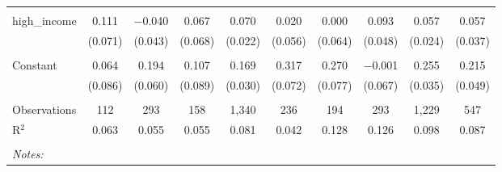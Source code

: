 \begin{table}[!htbp]
\begin{tabular}{@{\extracolsep{5pt}}lccccccccc}
  & & & & & & & & & \\ 
 high\_income & 0.111 & $-$0.040 & 0.067 & 0.070 & 0.020 & 0.000 & 0.093 & 0.057 & 0.057 \\ 
  & (0.071) & (0.043) & (0.068) & (0.022) & (0.056) & (0.064) & (0.048) & (0.024) & (0.037) \\ 
  & & & & & & & & & \\ 
 Constant & 0.064 & 0.194 & 0.107 & 0.169 & 0.317 & 0.270 & $-$0.001 & 0.255 & 0.215 \\ 
  & (0.086) & (0.060) & (0.089) & (0.030) & (0.072) & (0.077) & (0.067) & (0.035) & (0.049) \\ 
  & & & & & & & & & \\ 
Observations & 112 & 293 & 158 & 1,340 & 236 & 194 & 293 & 1,229 & 547 \\ 
R$^{2}$ & 0.063 & 0.055 & 0.055 & 0.081 & 0.042 & 0.128 & 0.126 & 0.098 & 0.087 \\ 
\hline \\[-1.8ex] 
\textit{Notes:} & \multicolumn{9}{l}{} \\ 
\end{tabular} 
\end{table} 
